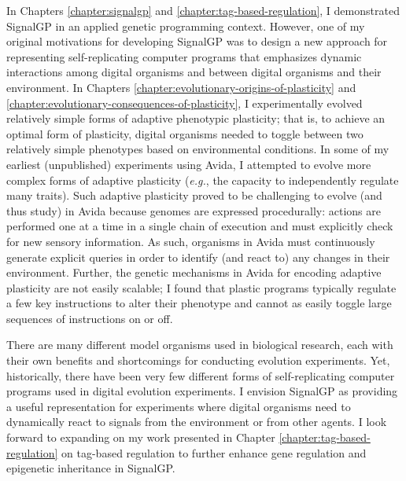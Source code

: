 In Chapters \ref{chapter:signalgp} and \ref{chapter:tag-based-regulation}, I demonstrated SignalGP in an applied genetic programming context. 
However, one of my original motivations for developing SignalGP was to design a new approach for representing self-replicating computer programs that emphasizes dynamic interactions among digital organisms and between digital organisms and their environment.
In Chapters \ref{chapter:evolutionary-origins-of-plasticity} and \ref{chapter:evolutionary-consequences-of-plasticity}, I experimentally evolved relatively simple forms of adaptive phenotypic plasticity; that is, to achieve an optimal form of plasticity, digital organisms needed to toggle between two relatively simple phenotypes based on environmental conditions. 
In some of my earliest (unpublished) experiments using Avida, I attempted to evolve more complex forms of adaptive plasticity (\textit{e.g.}, the capacity to independently regulate many traits). 
Such adaptive plasticity proved to be challenging to evolve (and thus study) in Avida because genomes are expressed procedurally: actions are performed one at a time in a single chain of execution and must explicitly check for new sensory information.
As such, organisms in Avida must continuously generate explicit queries in order to identify (and react to) any changes in their environment.
Further, the genetic mechanisms in Avida for encoding adaptive plasticity are not easily scalable; I found that plastic programs typically regulate a few key instructions to alter their phenotype and cannot as easily toggle large sequences of instructions on or off.

There are many different model organisms used in biological research, each with their own benefits and shortcomings for conducting evolution experiments. 
Yet, historically, there have been very few different forms of self-replicating computer programs used in digital evolution experiments. 
I envision SignalGP as providing a useful representation for experiments where digital organisms need to dynamically react to signals from the environment or from other agents. 
I look forward to expanding on my work presented in Chapter \ref{chapter:tag-based-regulation} on tag-based regulation to further enhance gene regulation and epigenetic inheritance in SignalGP.   


